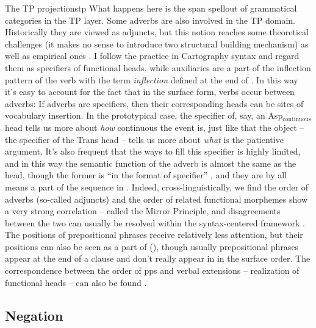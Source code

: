 \documentclass[UTF8, a4paper, oneside, scheme=plain]{ctexrep}
\newcommand*{\citepage}[1]{pp.~{#1}}
\newcommand*{\term}[1]{\emph{#1}}
\begin{document}
\begin{theorybox}{The TP projections}{tp}
    What happens here is the span spellout of grammatical categories in the TP layer.
    Some adverbs are also involved in the TP domain.
    Historically they are viewed as adjuncts,
    but this notion reaches some theoretical challenges 
    (it makes no sense to introduce two structural building mechanism)
    as well as empirical ones \citep{sportiche2017fewer}.
    I follow the practice in Cartography syntax and regard them as specifiers of functional heads.
    while auxiliaries are a part of the inflection pattern of the verb 
    with the term \term{inflection} defined 
    at the end of .
    In this way it's easy to account for the fact that 
    in the surface form, verbs occur between adverbs:
    If adverbs are specifiers,
    then their corresponding heads can be sites of vocabulary insertion.
    In the prototypical case, 
    the specifier of, say, an Asp$_{\text{continuous}}$ head 
    tells us more about \emph{how} continuous the event is,
    just like that the object -- the specifier of the Trans head -- 
    tells us more about \emph{what} is the patientive argument.
    It's also frequent that the ways to fill this specifier is highly limited,
    and in this way the semantic function of the adverb 
    is almost the same as the head, though the former is ``in the format of specifier''
    \citep{shlonsky2010cartographic},
    and they are by all means a part of the sequence in .
    Indeed, cross-linguistically, 
    we find the order of adverbs (so-called adjuncts) and the order of related functional morphemes 
    show a very strong correlation -- called the Mirror Principle,
    and disagreements between the two can usually be resolved 
    within the syntax-centered framework \citep{harley2010affixation}.
    The positions of prepositional phrases receive relatively less attention,
    but their positions can also be seen as a part of 
    (\citealt[\citepage{106}]{schweikert2005order}),
    though usually prepositional phrases appear at the end of a clause 
    and don't really appear in  in the surface order.
    The correspondence between the order of \acs{pp}s and verbal extensions 
    -- realization of functional heads -- 
    can also be found \citep[\citepage{160}]{cinque2006restructuring}.
\end{theorybox}

\subsection{Negation} 
\end{document}
